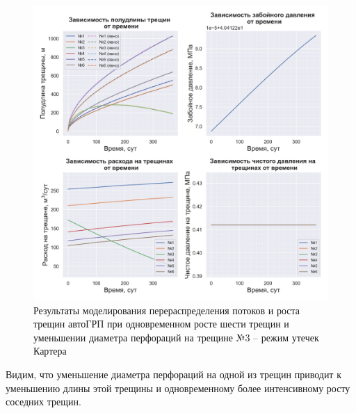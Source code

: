\begin{figure}[H] 
\center
\includegraphics[width=\linewidth]{images/myimage13.jpg}
\caption{Результаты моделирования перераспределения потоков и роста трещин автоГРП при одновременном росте шести трещин и уменьшении диаметра перфораций на трещине №3 -- режим утечек Картера}
\label{fig:myimage13}
\end{figure}

Видим, что уменьшение диаметра перфораций на одной из трещин приводит к уменьшению длины этой трещины и одновременному более интенсивному росту соседних трещин.

%

